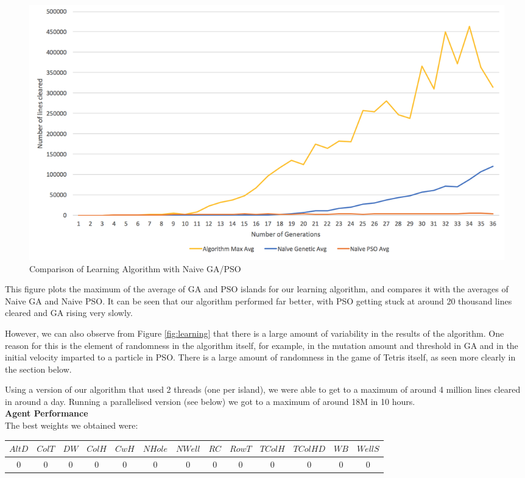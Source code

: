 \documentclass[12pt]{article}
\begin{document}
	\begin{figure}[H]
		\includegraphics[scale=0.3]{learning/Naive}
		\centering
		\caption{Comparison of Learning Algorithm with Naive GA/PSO}
		\label{fig:naive}
	\end{figure}

	This figure plots the maximum of the average of GA and PSO islands for
	our learning algorithm, and compares it with the averages of Naive GA and
	Naive PSO. It can be seen that our algorithm performed far better, with PSO
	getting stuck at around 20 thousand lines cleared and GA rising very slowly.

	However, we can also observe from Figure \ref{fig:learning} that there is a large amount
	of variability in the results of the algorithm. One reason for this is the element
	of randomness in the algorithm itself, for example, in the mutation amount and threshold
	in GA and in the initial velocity imparted to a particle in PSO. There is
	a large amount of randomness in the game of Tetris itself, as seen more clearly
	in the section below.

	Using a version of our algorithm that used 2 threads (one per island),
	we were able to get to a maximum of around 4 million lines cleared in
	around a day. Running a parallelised version (see below) we got to a maximum of
	around 18M in 10 hours.\\

	\textbf{Agent Performance}\\
	The best weights we obtained were:\\

	\vspace{-2mm}
	\begin{tabular}{ | c | c | c | c | c | c | c | c | c | c | c | c | c | }
		\hline
		$AltD$ & $ColT$ & $DW$ & $ColH$ & $CwH$ & $NHole$ & $NWell$ & $RC$ & $RowT$ & $TColH$ & $TColHD$ & $WB$ & $WellS$ \\ \hline
		0 & 0 & 0 & 0 & 0 & 0 & 0 & 0 & 0 & 0 & 0 & 0 & 0 \\ \hline
	\end{tabular}\\[0.25em]
\end{document}
